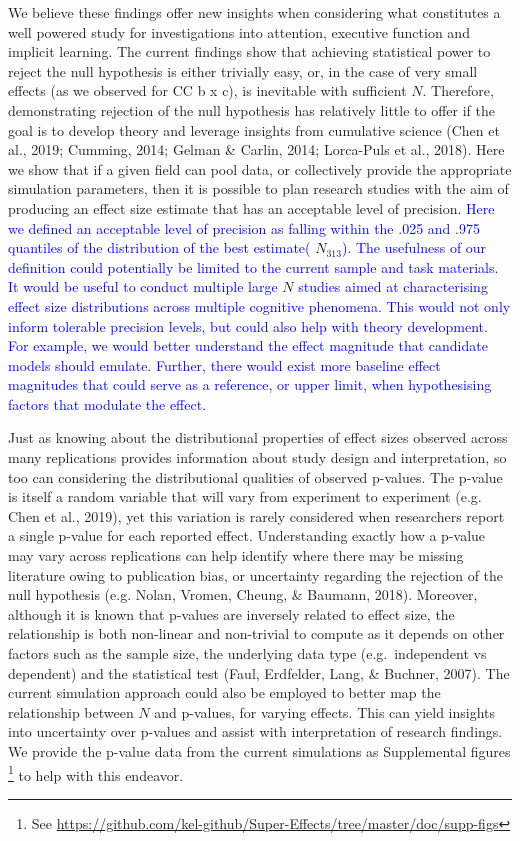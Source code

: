 \documentclass[
  man]{apa6}
\begin{document}
We believe these findings offer new insights when considering what constitutes a well powered study for investigations into attention, executive function and implicit learning. The current findings show that achieving statistical power to reject the null hypothesis is either trivially easy, or, in the case of very small effects (as we observed for CC b x c), is inevitable with sufficient \(N\). Therefore, demonstrating rejection of the null hypothesis has relatively little to offer if the goal is to develop theory and leverage insights from cumulative science (Chen et al., 2019; Cumming, 2014; Gelman \& Carlin, 2014; Lorca-Puls et al., 2018). Here we show that if a given field can pool data, or collectively provide the appropriate simulation parameters, then it is possible to plan research studies with the aim of producing an effect size estimate that has an acceptable level of precision. \textcolor{blue}{Here we defined an acceptable level of precision as falling within the .025 and .975 quantiles of the distribution of the best estimate(} \(N_{313}\)\textcolor{blue}{). The usefulness of our definition could potentially be limited to the current sample and task materials. It would be useful to conduct multiple large} \(N\) \textcolor{blue}{studies aimed at characterising effect size distributions across multiple cognitive phenomena. This would not only inform tolerable precision levels, but could also help with theory development. For example, we would better understand the effect magnitude that candidate models should emulate. Further, there would exist more baseline effect magnitudes that could serve as a reference, or upper limit, when hypothesising factors that modulate the effect.}

Just as knowing about the distributional properties of effect sizes observed across many replications provides information about study design and interpretation, so too can considering the distributional qualities of observed p-values. The p-value is itself a random variable that will vary from experiment to experiment (e.g. Chen et al., 2019), yet this variation is rarely considered when researchers report a single p-value for each reported effect. Understanding exactly how a p-value may vary across replications can help identify where there may be missing literature owing to publication bias, or uncertainty regarding the rejection of the null hypothesis (e.g. Nolan, Vromen, Cheung, \& Baumann, 2018). Moreover, although it is known that p-values are inversely related to effect size, the relationship is both non-linear and non-trivial to compute as it depends on other factors such as the sample size, the underlying data type (e.g.~independent vs dependent) and the statistical test (Faul, Erdfelder, Lang, \& Buchner, 2007). The current simulation approach could also be employed to better map the relationship between \(N\) and p-values, for varying effects. This can yield insights into uncertainty over p-values and assist with interpretation of research findings. We provide the p-value data from the current simulations as Supplemental figures \footnote{See \url{https://github.com/kel-github/Super-Effects/tree/master/doc/supp-figs}} to help with this endeavor.
\end{document}
